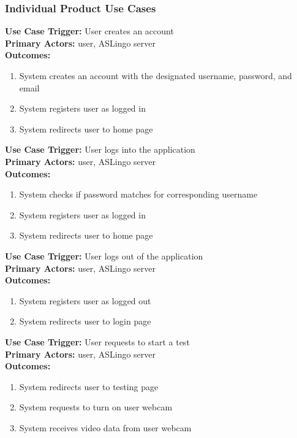 \documentclass[12pt, titlepage]{article}
\begin{document}
  \subsubsection{Individual Product Use Cases}
  
  \textbf{Use Case Trigger:} User creates an account\\
  \textbf{Primary Actors:} user, ASLingo server\\
  \textbf{Outcomes:}
  \begin{enumerate}
      \item System creates an account with the designated username, password, and email
      \item System registers user as logged in
      \item System redirects user to home page
  \end{enumerate}
  \textbf{Use Case Trigger:} User logs into the application\\
  \textbf{Primary Actors:} user, ASLingo server\\
  \textbf{Outcomes:}
  \begin{enumerate}
      \item System checks if password matches for corresponding username
      \item System registers user as logged in
      \item System redirects user to home page
  \end{enumerate}
  \textbf{Use Case Trigger:} User logs out of the application\\
  \textbf{Primary Actors:} user, ASLingo server\\
  \textbf{Outcomes:}
  \begin{enumerate}
      \item System registers user as logged out
      \item System redirects user to login page
  \end{enumerate}
  \textbf{Use Case Trigger:} User requests to start a test\\
  \textbf{Primary Actors:} user, ASLingo server\\
  \textbf{Outcomes:}
  \begin{enumerate}
      \item System redirects user to testing page
      \item System requests to turn on user webcam
      \item System receives video data from user webcam
  \end{enumerate}
\end{document}
